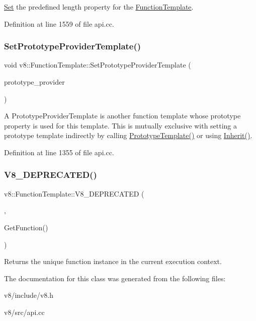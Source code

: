 \mbox{\hyperlink{classv8_1_1Set}{Set}} the predefined length property for the \mbox{\hyperlink{classv8_1_1FunctionTemplate}{Function\+Template}}. 

Definition at line 1559 of file api.\+cc.

\mbox{\label{classv8_1_1FunctionTemplate_abbe5fd8e3688db6dfb3793f9a48aa372}} 
\subsubsection{\texorpdfstring{Set\+Prototype\+Provider\+Template()}{SetPrototypeProviderTemplate()}}
{\footnotesize\ttfamily void v8\+::\+Function\+Template\+::\+Set\+Prototype\+Provider\+Template (\begin{DoxyParamCaption}\item[{\mbox{\hyperlink{classv8_1_1Local}{Local}}$<$ \mbox{\hyperlink{classv8_1_1FunctionTemplate}{Function\+Template}} $>$}]{prototype\+\_\+provider }\end{DoxyParamCaption})}

A Prototype\+Provider\+Template is another function template whose prototype property is used for this template. This is mutually exclusive with setting a prototype template indirectly by calling \mbox{\hyperlink{classv8_1_1FunctionTemplate_a086408da7fe81f69f0d3bbcb95e83cc7}{Prototype\+Template()}} or using \mbox{\hyperlink{classv8_1_1FunctionTemplate_abc11c462facf11bafd541892815c5425}{Inherit()}}. 

Definition at line 1355 of file api.\+cc.

\mbox{\label{classv8_1_1FunctionTemplate_abd995d08f790cadf070d0fbd2af34b50}} 
\subsubsection{\texorpdfstring{V8\+\_\+\+D\+E\+P\+R\+E\+C\+A\+T\+E\+D()}{V8\_DEPRECATED()}}
{\footnotesize\ttfamily v8\+::\+Function\+Template\+::\+V8\+\_\+\+D\+E\+P\+R\+E\+C\+A\+T\+ED (\begin{DoxyParamCaption}\item[{\char`\"{}Use maybe version\char`\"{}}]{,  }\item[{\mbox{\hyperlink{classv8_1_1Local}{Local}}$<$ \mbox{\hyperlink{classv8_1_1Function}{Function}} $>$ }]{Get\+Function() }\end{DoxyParamCaption})}

Returns the unique function instance in the current execution context. 

The documentation for this class was generated from the following files\+:\begin{DoxyCompactItemize}
\item 
v8/include/v8.\+h\item 
v8/src/api.\+cc\end{DoxyCompactItemize}
